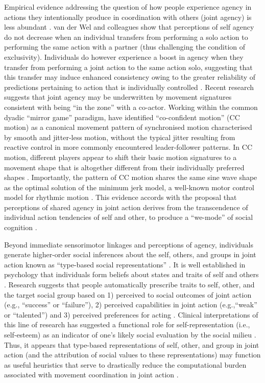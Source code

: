 \begin{CJK}{UTF8}{gbsn}
  Empirical evidence addressing the question of how people experience agency in actions they intentionally produce in coordination with others (joint agency) is less abundant \citep[but see][]{VanderWel2012,VanderWel2013}. van der Wel and colleagues show that perceptions of self agency do not decrease when an individual transfers from performing a solo action to performing the same action with a partner (thus challenging the condition of exclusivity).  Individuals do however experience a boost in agency when they transfer from performing a joint action to the same action solo, suggesting that this transfer may induce enhanced consistency owing to the greater reliability of predictions pertaining to action that is individually controlled \citep{VanderWel2012}.  Recent research suggests that joint agency may be underwritten by  movement signatures consistent with being ``in the zone'' with a co-actor.  Working within the common dyadic ``mirror game'' paradigm, \textcite{Noy2011,Noy2015,Hart2014} have identified ``co-confident motion'' (CC motion) as a canonical movement pattern of synchronised motion characterised by smooth and jitter-less motion, without the typical jitter resulting from reactive control in more commonly encountered leader-follower patterns.  In CC motion, different players appear to shift their basic motion signatures to a movement shape that is altogether different from their individually preferred shapes \citep{Hart2014}.  Importantly, the pattern of CC motion shares the same sine wave shape as the optimal solution of the minimum jerk model, a well-known motor control model for rhythmic motion \citep{Hogan2007}.  This evidence accords with the proposal that perceptions of shared agency in joint action derives from the transcendence of individual action tendencies of self and other, to produce a ``we-mode'' of social cognition \citep{Gallotti2013}.

Beyond immediate sensorimotor linkages and perceptions of agency,  individuals generate higher-order social inferences about the self, others, and groups in joint action known as ``type-based social representations'' \citep{Moutoussis2014}.  It is well established in psychology that individuals form beliefs about states and traits of self and others \citep{Bem1967,Fowler2006}.  Research suggests that people automatically prescribe traits to self, other, and the target social group based on 1) perceived to social outcomes of joint action (e.g., ``success'' or ``failure''), 2) perceived capabilities in joint action (e.g.,``weak'' or ``talented'') and 3) perceived preferences for acting \citep[e.g., ``good,'' ``fair,'' or ``trustworthy'';][]{Moutoussis2014}.  Clinical interpretations of this line of research has suggested a functional role for self-representation (i.e., self-esteem) as an indicator of one's likely social evaluation by the social milieu \citep{Leary1995}. Thus, it appears that type-based representations of self, other, and group in joint action (and the attribution of social values to these representations) may function as useful heuristics that serve to drastically reduce the computational burden associated with movement coordination in joint action \citep{Moutoussis2011}.


\end{CJK}
